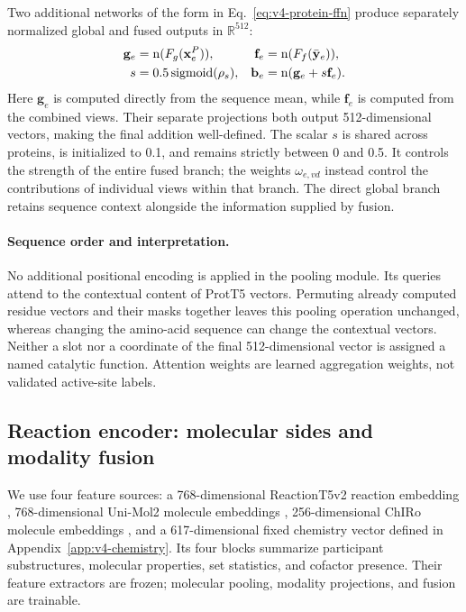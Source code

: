 Two additional networks of the form in Eq.~\eqref{eq:v4-protein-ffn} produce
separately normalized global and fused outputs in $\mathbb{R}^{512}$:
\begin{align}
  \mathbf{g}_e &= \operatorname{n}(F_g(\mathbf{x}_e^{P})), & \mathbf{f}_e&=\operatorname{n}(F_f(\bar{\mathbf{y}}_e)),\\
  s&=0.5\operatorname{sigmoid}(\rho_s), & \mathbf{b}_e&=\operatorname{n}(\mathbf{g}_e+s \mathbf{f}_e).
  \label{eq:v4-protein-output}
\end{align}
Here $\mathbf g_e$ is computed directly from the sequence mean, while
$\mathbf f_e$ is computed from the combined views. Their separate projections
both output 512-dimensional vectors, making the final addition well-defined.
The scalar $s$ is shared across proteins, is initialized to 0.1, and remains
strictly between 0 and 0.5. It controls the strength of the entire fused branch;
the weights $\omega_{e,vd}$ instead control the contributions of individual
views within that branch. The direct global branch retains sequence context
alongside the information supplied by fusion.

\paragraph{Sequence order and interpretation.}
No additional positional encoding is applied in the pooling module. Its
queries attend to the contextual content of ProtT5 vectors. Permuting already
computed residue vectors and their masks together leaves this pooling operation
unchanged, whereas changing the amino-acid sequence can change the contextual
vectors. Neither a slot nor a coordinate of the final 512-dimensional vector
is assigned a named catalytic function. Attention weights are learned
aggregation weights, not validated active-site labels.

\subsection{Reaction encoder: molecular sides and modality fusion}
\label{sec:v4-reaction}
We use four feature sources: a 768-dimensional ReactionT5v2 reaction embedding
\citep{sagawa2023reactiont5,sagawaReactionT5v2}, 768-dimensional Uni-Mol2
molecule embeddings \citep{ji2024unimol2}, 256-dimensional ChIRo molecule
embeddings \citep{adams2022chiro}, and a 617-dimensional fixed chemistry
vector defined in Appendix~\ref{app:v4-chemistry}. Its four blocks summarize
participant substructures, molecular properties, set statistics, and cofactor
presence. Their feature extractors are frozen; molecular pooling, modality
projections, and fusion are trainable.

